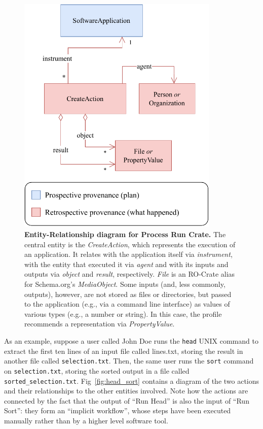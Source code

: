 \documentclass[10pt,letterpaper]{article}
\begin{document}
\begin{figure}[!ht]
\includegraphics[width=26em]{wrroc-figure1.drawio.pdf}
\caption{{\bf Entity-Relationship diagram for Process Run Crate.}
The central entity is the \emph{CreateAction}, which represents the execution of an application.
It relates with the application itself via \emph{instrument}, with the entity that executed it via \emph{agent} and with its inputs and outputs via \emph{object}
and \emph{result}, respectively. 
\emph{File} is an RO-Crate alias for Schema.org's \emph{MediaObject}.
Some inputs (and, less commonly, outputs), however, are not stored as files or directories, but passed to the application (e.g., via a command line interface) as values of various types (e.g., a number or string). In this case, the profile recommends a representation via \emph{PropertyValue}. 
}
\label{fig:process_crate_er}
\end{figure}

As an example,
suppose a user called John Doe runs the \texttt{head} UNIX command to extract the first ten lines of an input file called lines.txt, storing the result in another file called \texttt{selection.txt}.
Then, the same user runs the \texttt{sort}
command on \texttt{selection.txt}, storing the sorted output in a file called \texttt{sorted\_selection.txt}.
Fig~\ref{fig:head_sort} contains a diagram of the two actions and their relationships to the other entities involved.
Note how the actions are connected by the fact that the output of ``Run Head'' is also the input of ``Run Sort'': they form an ``implicit workflow'', whose steps have been executed manually rather than by a higher level software tool.
\end{document}
